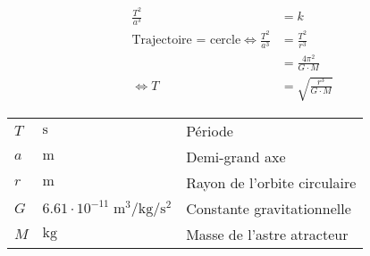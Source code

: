 \documentclass{article}
\newcommand{\deftable}[2]{%
\begin{table}[h]
    \centering
    \begin{tabular}{llp{100mm}}%
        #1
    \end{tabular}
    \label{tab:#2_units}
\end{table}%
}
\newcommand{\deftablevar}[3]{%
    $#1$ & $\si{#2}$ & #3 \\
}
\begin{document}
\begin{equation*}
    \begin{split}
        \frac{T^2}{a^3} &= k \\
        \text{Trajectoire = cercle} \iff \frac{T^2}{a^3} &= \frac{T^2}{r^3} \\
        &= \frac{4\pi^2}{G\cdot M} \\
        \iff T &= \sqrt{\frac{r^3}{G\cdot M}}
    \end{split}
\end{equation*}

\deftable{
    \deftablevar{T}{\second}{Période}
    \deftablevar{a}{\meter}{Demi-grand axe}
    \deftablevar{r}{\meter}{Rayon de l'orbite circulaire}
    \deftablevar{G}{6.61\cdot10^{-11}\;\meter\cubed\per\kilo\gram\per\second\squared}{Constante gravitationnelle}
    \deftablevar{M}{\kilo\gram}{Masse de l'astre atracteur}
}{troisieme_loi_kepler}
\end{document}
